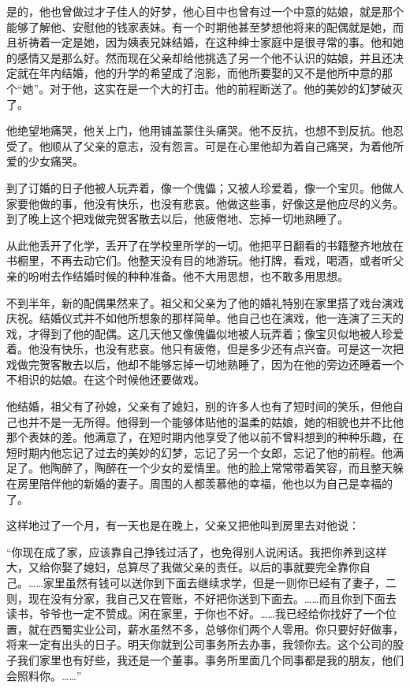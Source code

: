 \par 是的，他也曾做过才子佳人的好梦，他心目中也曾有过一个中意的姑娘，就是那个能够了解他、安慰他的钱家表妹。有一个时期他甚至梦想他将来的配偶就是她，而且祈祷着一定是她，因为姨表兄妹结婚，在这种绅士家庭中是很寻常的事。他和她的感情又是那么好。然而现在父亲却给他挑选了另一个他不认识的姑娘，并且还决定就在年内结婚，他的升学的希望成了泡影，而他所要娶的又不是他所中意的那个“她”。对于他，这实在是一个大的打击。他的前程断送了。他的美妙的幻梦破灭了。
\par 他绝望地痛哭，他关上门，他用铺盖蒙住头痛哭。他不反抗，也想不到反抗。他忍受了。他顺从了父亲的意志，没有怨言。可是在心里他却为着自己痛哭，为着他所爱的少女痛哭。
\par 到了订婚的日子他被人玩弄着，像一个傀儡；又被人珍爱着，像一个宝贝。他做人家要他做的事，他没有快乐，也没有悲哀。他做这些事，好像这是他应尽的义务。到了晚上这个把戏做完贺客散去以后，他疲倦地、忘掉一切地熟睡了。
\par 从此他丢开了化学，丢开了在学校里所学的一切。他把平日翻看的书籍整齐地放在书橱里，不再去动它们。他整天没有目的地游玩。他打牌，看戏，喝酒，或者听父亲的吩咐去作结婚时候的种种准备。他不大用思想，也不敢多用思想。
\par 不到半年，新的配偶果然来了。祖父和父亲为了他的婚礼特别在家里搭了戏台演戏庆祝。结婚仪式并不如他所想象的那样简单。他自己也在演戏，他一连演了三天的戏，才得到了他的配偶。这几天他又像傀儡似地被人玩弄着；像宝贝似地被人珍爱着。他没有快乐，也没有悲哀。他只有疲倦，但是多少还有点兴奋。可是这一次把戏做完贺客散去以后，他却不能够忘掉一切地熟睡了，因为在他的旁边还睡着一个不相识的姑娘。在这个时候他还要做戏。
\par 他结婚，祖父有了孙媳，父亲有了媳妇，别的许多人也有了短时间的笑乐，但他自己也并不是一无所得。他得到一个能够体贴他的温柔的姑娘，她的相貌也并不比他那个表妹的差。他满意了，在短时期内他享受了他以前不曾料想到的种种乐趣，在短时期内他忘记了过去的美妙的幻梦，忘记了另一个女郎，忘记了他的前程。他满足了。他陶醉了，陶醉在一个少女的爱情里。他的脸上常常带着笑容，而且整天躲在房里陪伴他的新婚的妻子。周围的人都羡慕他的幸福，他也以为自己是幸福的了。
\par 这样地过了一个月，有一天也是在晚上，父亲又把他叫到房里去对他说：
\par “你现在成了家，应该靠自己挣钱过活了，也免得别人说闲话。我把你养到这样大，又给你娶了媳妇，总算尽了我做父亲的责任。以后的事就要完全靠你自己。……家里虽然有钱可以送你到下面去继续求学，但是一则你已经有了妻子，二则，现在没有分家，我自己又在管账，不好把你送到下面去。……而且你到下面去读书，爷爷也一定不赞成。闲在家里，于你也不好。……我已经给你找好了一个位置，就在西蜀实业公司，薪水虽然不多，总够你们两个人零用。你只要好好做事，将来一定有出头的日子。明天你就到公司事务所去办事，我领你去。这个公司的股子我们家里也有好些，我还是一个董事。事务所里面几个同事都是我的朋友，他们会照料你。……”
